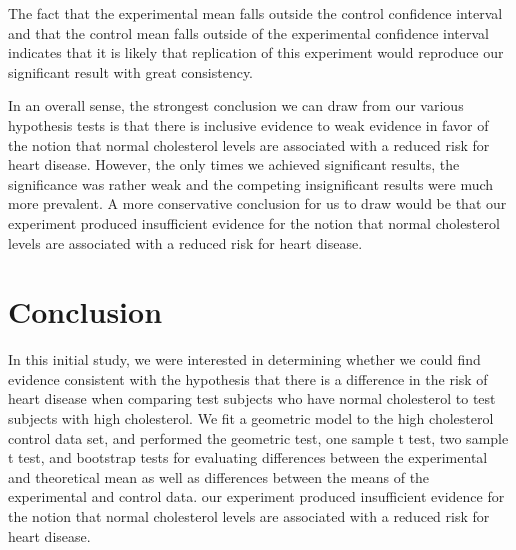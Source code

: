 \documentclass{amsart}
\begin{document}
The fact that the experimental mean falls outside the control confidence interval and that the control mean falls outside of the experimental confidence interval indicates that it is likely that replication of this experiment would reproduce our significant result with great consistency.

In an overall sense, the strongest conclusion we can draw from our various hypothesis tests is that there is inclusive evidence to weak evidence in favor of the notion that normal cholesterol levels are associated with a reduced risk for heart disease. However, the only times we achieved significant results, the significance was rather weak and the competing insignificant results were much more prevalent. A more conservative conclusion for us to draw would be that our experiment produced insufficient evidence for the notion that normal cholesterol levels are associated with a reduced risk for heart disease.
\section{Conclusion}
In this initial study, we were interested in determining whether we could find evidence consistent with the hypothesis that there is a difference in the risk of heart disease when comparing test subjects who have normal cholesterol to test subjects with high cholesterol. We fit a geometric model to the high cholesterol control data set, and performed the geometric test, one sample t test, two sample t test, and bootstrap tests for evaluating differences between the experimental and theoretical mean as well as differences between the means of the experimental and control data. our experiment produced insufficient evidence for the notion that  normal cholesterol levels are associated with a reduced risk for heart disease.
\end{document}
